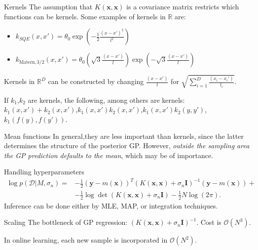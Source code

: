 \documentclass{beamer}
\begin{document}
\begin{frame}{}
\begin{block}{Kernels}
The assumption that $K(\mathbf{x},\mathbf{x})$ is a covariance matrix restricts which functions can be kernels. Some examples of kernels in $\mathbb{R}$ are:
\begin{itemize}
\item $k_{SQE}(x,x') = \theta_0 \exp \left(-\frac{1}{2} \frac{(x-x')^2}{l^2} \right)$
\item $k_{\text{Matern},3/2}(x,x') = \theta_0 \left( \sqrt{3} \frac{(x-x')}{l} \right) \exp \left(-\sqrt{3} \frac{(x-x')}{l}\right)$
\end{itemize}
Kernels in $\mathbb{R}^D$ can be constructed by changing $\frac{(x-x')}{l}$ for $\sqrt{\sum_{i=1}^D \frac{(x_i-x_i')}{l_i}}$.

If $k_1$,$k_2$ are kernels, the following, among others are kernels: $k_1(x,x')+k_2(x,x')$,$k_1(x,x')k_2(x,x')$,$k_1(x,x')k_2(y,y')$,$k_1(f(y),f(y'))$.
\end{block}
\begin{block}{Mean functions}
In general,they are less important than kernels, since the latter determines the structure of the posterior GP. However, \textit{outside the sampling area the GP prediction defaults to the mean}, which may be of importance.
\end{block}
\end{frame}

\begin{frame}{}
\begin{block}{Handling hyperparameters}
\begin{equation*}
\begin{split}
\log p(\mathcal{D}|M,\sigma_n) = & -\frac{1}{2}(\mathbf{y} - m(\mathbf{x}))^T (K(\mathbf{x},\mathbf{x}) + \sigma_n \mathbf{I})^{-1} (\mathbf{y} - m(\mathbf{x})) + \\
&-\frac{1}{2} \log \det (K(\mathbf{x},\mathbf{x}) + \sigma_n \mathbf{I}) - \frac{1}{2} N \log(2\pi).
\end{split}
\end{equation*}
Inference can be done either by MLE, MAP, or integration techniques.
\end{block}
\begin{block}{Scaling}
The bottleneck of GP regression: $(K(\mathbf{x},\mathbf{x}) + \sigma_n \mathbf{I})^{-1}$. Cost is $\mathcal{O}(N^3)$.

In online learning, each new sample is incorporated in $\mathcal{O}(N^2)$.
\end{block}

\end{frame}
\end{document}
